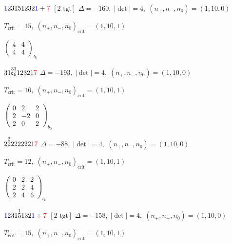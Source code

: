 \documentclass[10pt]{article}
\begin{document}
\smallskip

$\textcolor{blue}{1}23151232\textcolor{blue}{1}+\textcolor{red}{7}$ $\scriptstyle [2\text{-tgt}]$ \quad $\Delta=-160,\; |\det|=4,\; (n_+,n_-,n_0)=(1,10,0)$

\hspace{1em}$T_{\text{crit}}=15,\; (n_+,n_-,n_0)_{\text{crit}}=(1,10,1)$

\hspace{2em}$\left(\begin{smallmatrix}4 & 4 \\ 4 & 4\end{smallmatrix}\right)_{\!b_0}$

\smallskip

$31\overset{31}{\mathfrak{e}_6}12321\textcolor{red}{7}$ \quad $\Delta=-193,\; |\det|=4,\; (n_+,n_-,n_0)=(1,10,0)$

\hspace{1em}$T_{\text{crit}}=16,\; (n_+,n_-,n_0)_{\text{crit}}=(1,10,1)$

\hspace{2em}$\left(\begin{smallmatrix}0 & 2 & 2 \\ 2 & -2 & 0 \\ 2 & 0 & 2\end{smallmatrix}\right)_{\!b_0}$

\smallskip

$2\overset{2}{2}2222221\textcolor{red}{7}$ \quad $\Delta=-88,\; |\det|=4,\; (n_+,n_-,n_0)=(1,10,0)$

\hspace{1em}$T_{\text{crit}}=12,\; (n_+,n_-,n_0)_{\text{crit}}=(1,10,1)$

\hspace{2em}$\left(\begin{smallmatrix}0 & 2 & 2 \\ 2 & 2 & 4 \\ 2 & 4 & 6\end{smallmatrix}\right)_{\!b_0}$

\smallskip

$\textcolor{blue}{1}231\overset{1}{5}132\textcolor{blue}{1}+\textcolor{red}{7}$ $\scriptstyle [2\text{-tgt}]$ \quad $\Delta=-158,\; |\det|=4,\; (n_+,n_-,n_0)=(1,10,0)$

\hspace{1em}$T_{\text{crit}}=15,\; (n_+,n_-,n_0)_{\text{crit}}=(1,10,1)$
\end{document}
